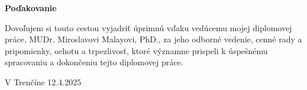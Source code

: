 

\vspace*{\fill}

\noindent \textbf{Poďakovanie}

\vspace{1em}

Dovoľujem si touto cestou vyjadriť úprimnú vďaku vedúcemu mojej diplomovej práce, MUDr. Miroslavovi Malayovi, PhD., za jeho odborné vedenie, cenné rady a pripomienky, ochotu a trpezlivosť, ktoré významne prispeli k úspešnému spracovaniu a dokončeniu tejto diplomovej práce.

\vspace{2cm}

\noindent V Trenčíne 12.4.2025

\clearpage
